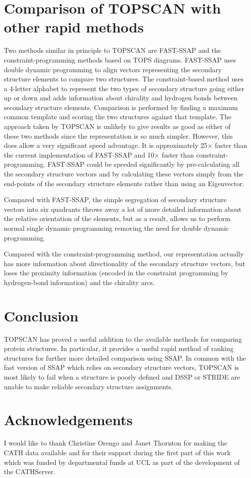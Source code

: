 \documentclass{article}
\begin{document}
\section{Comparison of TOPSCAN with other rapid methods}
Two methods similar in principle to TOPSCAN are FAST-SSAP and the
constraint-programming methods based on TOPS
diagrams\cite{David_Gilbert_David_Westhead}.  FAST-SSAP uses
double dynamic programming to align vectors representing the secondary
structure elements to compare two structures. The constraint-based
method uses a 4-letter alphabet to represent the two types of
secondary structure going either up or down and adds information about
chirality and hydrogen bonds between secondary structure elements.
Comparison is performed by finding a maximum common template and
scoring the two structures against that template.  The approach taken
by TOPSCAN is unlikely to give results as good as either of these two
methods since the representation is so much simpler. However, this
does allow a very significant speed advantage. It is approximately
25$\times$ faster than the current implementation of FAST-SSAP and
10$\times$ faster than constraint-programming.  FAST-SSAP could be
speeded significantly by pre-calculating all the secondary structure
vectors and by calculating these vectors simply from the end-points of
the secondary structure elements rather than using an Eigenvector.


Compared with FAST-SSAP, the simple segregation of secondary structure
vectors into six quadrants throws away a lot of more detailed
information about the relative orientation of the elements, but as a
result, allows us to perform normal single dynamic programming
removing the need for double dynamic programming.

Compared with the constraint-programming method, our representation
actually has more information about directionality of the secondary
structure vectors, but loses the proximity information (encoded in the
constraint programming by hydrogen-bond information) and the chirality
arcs. 

\section{Conclusion}
TOPSCAN has proved a useful addition to the available methods for
comparing protein structures. In particular, it provides a useful
rapid method of ranking structures for further more detailed
comparison using SSAP. In common with the fast version of SSAP which
relies on secondary structure vectors, TOPSCAN is most likely to fail
when a structure is poorly defined and DSSP or STRIDE are unable to
make reliable secondary structure assignments.

\section{Acknowledgements}
I would like to thank Christine Orengo and Janet Thornton for making
the CATH data available and for their support during the first part of
this work which was funded by departmental funds at UCL as part of the
development of the CATHServer. 
\end{document}
